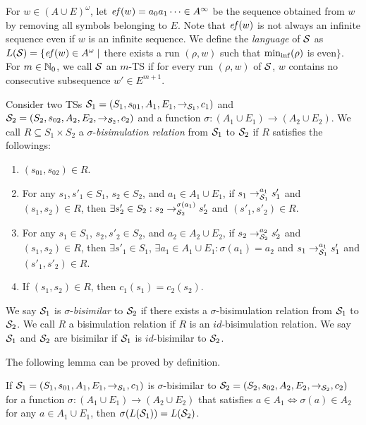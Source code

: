 For $w\in (A\cup E)^\omega$, let
$\mathit{ef}(w) = a_0a_1\cdots\in A^\infty$ be the sequence obtained from $w$ by removing all symbols belonging to $E$.
Note that $\mathit{ef}(w)$ is not always an infinite sequence even if $w$ is an infinite sequence.
We define the \emph{language} of ${\cal S}$ as
$L({\cal S})=\{\mathit{ef}(w)\in A^\omega\mid$
there exists a run $(\rho,w)$ such that ${\rm min_{inf}}(\rho)$ is even$\}$.
For $m\in\mathbb{N}_0$, we call ${\cal S}$ an $m$-TS
if for every run $(\rho,w)$ of ${\cal S}$,
$w$ contains no consecutive subsequence $w'\in E^{m+1}$.



Consider two TSs
${\cal S}_1=(S_1,s_{01},A_1,E_1,{\to_{{\cal S}_1}},c_1)$ and
${\cal S}_2=(S_2,s_{02},A_2,E_2,{\to_{{\cal S}_2}},\allowbreak c_2)$
and
a function $\sigma:(A_1\cup E_1)\to(A_2\cup E_2)$.
We call $R\subseteq S_1\times S_2$
a $\sigma$-\emph{bisimulation relation} from ${\cal S}_1$ to ${\cal S}_2$
if $R$ satisfies the followings:
\begin{enumerate}[label=(\arabic*)]
\item $(s_{01},s_{02})\in R$.
\item For any $s_1,s'_1\in S_1$, $s_2\in S_2$, and
  $a_1\in A_1\cup E_1$,
  if $s_1\to_{{\cal S}_1}^{a_1} s'_1$ and $(s_1,s_2)\in R$,
  then $\exists s'_2\in S_2: s_2\to_{{\cal S}_2}^{\sigma(a_1)} s'_2$
  and $(s'_1,s'_2)\in R$.
\item For any $s_1\in S_1$, $s_2,s'_2\in S_2$, and
  $a_2\in A_2\cup E_2$,
  if $s_2\to_{{\cal S}_2}^{a_2} s'_2$ and $(s_1,s_2)\in R$,
  then $\exists s'_1\in S_1$, $\exists a_1\in A_1\cup E_1:
  \sigma(a_1)=a_2$ and
  $s_1\to_{{\cal S}_1}^{a_1} s'_1$
  and $(s'_1,s'_2)\in R$.
\item If $(s_1,s_2)\in R$, then $c_1(s_1)=c_2(s_2)$.
\end{enumerate}
%
We say ${\cal S}_1$ is $\sigma$-\emph{bisimilar} to
${\cal S}_2$ if there exists a $\sigma$-bisimulation relation
from ${\cal S}_1$ to ${\cal S}_2$.
%
We call $R$ a bisimulation relation
if $R$ is an $\mathit{id}$-bisimulation relation.
We say ${\cal S}_1$ and ${\cal S}_2$ are bisimilar if
${\cal S}_1$ is $\mathit{id}$-bisimilar to ${\cal S}_2$.

The following lemma can be proved by definition.
\begin{lemma}\label{lemma:bisim-lang}
If
${\cal S}_1=(S_1,s_{01},A_1,E_1,{\to_{{\cal S}_1}},c_1)$ is
$\sigma$-bisimilar to
${\cal S}_2=(S_2,s_{02},A_2,\allowbreak E_2,{\to_{{\cal S}_2}},c_2)$
for
a function $\sigma:(A_1\cup E_1)\to(A_2\cup E_2)$
that satisfies $a\in A_1 \Leftrightarrow \sigma(a)\in A_2$
for any $a\in A_1\cup E_1$,
then
$\sigma(L({\cal S}_1))=L({\cal S}_2)$.
\end{lemma}






